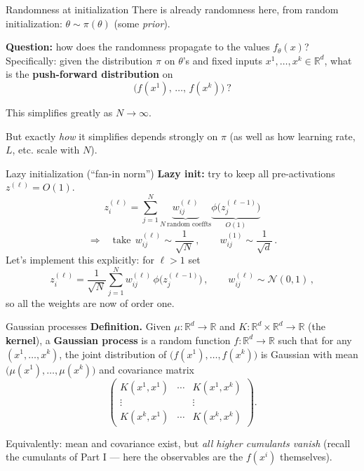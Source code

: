 \documentclass[11pt]{beamer}
\newcommand{\R}{\mathbb{R}}
\newcommand{\hl}[1]{{\color{blue!60!black}\textbf{#1}}}
\begin{document}
\begin{frame}{Randomness at initialization}
  There is already randomness here, from random initialization:
  $\theta \sim \pi(\theta)$ (some \emph{prior}).
  \vspace{2mm}

  \hl{Question:} how does the randomness propagate to the values
  $f_\theta(x)$? Specifically: given the distribution $\pi$ on
  $\theta$'s and fixed inputs $x^1, \dots, x^k \in \R^d$, what is the
  \hl{push-forward distribution} on
  \[
    \big(f(x^1),\, \dots,\, f(x^k)\big)\ ?
  \]
  \vspace{1mm}

  This simplifies greatly as $N\to \infty$.
  \vspace{1mm}

  But exactly \emph{how} it simplifies depends strongly on $\pi$ (as well as how learning rate, $L$, etc. scale with $N$).
\end{frame}

\begin{frame}{Lazy initialization (``fan-in norm'')}
  \hl{Lazy init:} try to keep all pre-activations $z^{(\ell)} = O(1)$.
  \[
    z^{(\ell)}_i = \sum_{j=1}^{N} \underbrace{w^{(\ell)}_{ij}}_{N\ \text{random coeffts}}
    \underbrace{\phi\big(z^{(\ell-1)}_j\big)}_{O(1)}
  \]
  \[
    \Longrightarrow\quad
    \text{take}\ \ w^{(\ell)}_{ij} \sim \frac{1}{\sqrt N}\,,\qquad
    w^{(1)}_{ij} \sim \frac{1}{\sqrt d}\,.
  \]
  Let's implement this explicitly: for $\ell>1$ set
  \[
    z^{(\ell)}_i = \frac{1}{\sqrt N}\sum_{j=1}^N w^{(\ell)}_{ij}\,
    \phi\big(z^{(\ell-1)}_j\big)\,,
    \qquad w^{(\ell)}_{ij} \sim \mathcal N(0,1)\,,
  \]
  so all the weights are now of order one.
\end{frame}

\begin{frame}{Gaussian processes}
  \textbf{Definition.} Given $\mu: \R^d \to \R$ and
  $K: \R^d\times\R^d \to \R$ (the \hl{kernel}), a \hl{Gaussian process}
  is a random function $f: \R^d \to \R$ such that for any
  $(x^1, \dots, x^k)$, the joint distribution of
  $\big(f(x^1), \dots, f(x^k)\big)$ is Gaussian with mean
  $\big(\mu(x^1), \dots, \mu(x^k)\big)$ and covariance matrix
  \[
    \begin{pmatrix}
      K(x^1,x^1) & \cdots & K(x^1,x^k) \\
      \vdots & & \vdots \\
      K(x^k,x^1) & \cdots & K(x^k,x^k)
    \end{pmatrix}.
  \]
  \vspace{1mm}

  Equivalently: mean and covariance exist, but \emph{all higher
  cumulants vanish} (recall the cumulants of Part I --- here the
  observables are the $f(x^i)$ themselves).
\end{frame}
\end{document}
